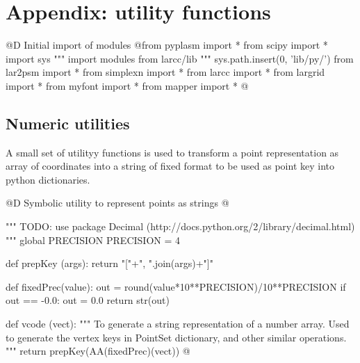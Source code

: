 \documentclass[11pt,oneside]{article}	%
\begin{document}
\appendix
\section{Appendix: utility functions}
@D Initial import of modules
@{from pyplasm import *
from scipy import *
import sys
""" import modules from larcc/lib """
sys.path.insert(0, 'lib/py/')
from lar2psm import *
from simplexn import *
from larcc import *
from largrid import *
from myfont import *
from mapper import *
@}
\subsection{Numeric utilities}

A small set of utilityy functions is used to transform a point representation as array of coordinates into a string of fixed format to be used as point key into python dictionaries.

@D Symbolic utility to represent points as strings
@{""" TODO: use package Decimal (http://docs.python.org/2/library/decimal.html) """
global PRECISION
PRECISION = 4 

def prepKey (args): return "["+", ".join(args)+"]"

def fixedPrec(value):
	out = round(value*10**PRECISION)/10**PRECISION
	if out == -0.0: out = 0.0
	return str(out)
	
def vcode (vect): 
	"""
	To generate a string representation of a number array.
	Used to generate the vertex keys in PointSet dictionary, and other similar operations.
	"""
	return prepKey(AA(fixedPrec)(vect))
@}




\end{document}
